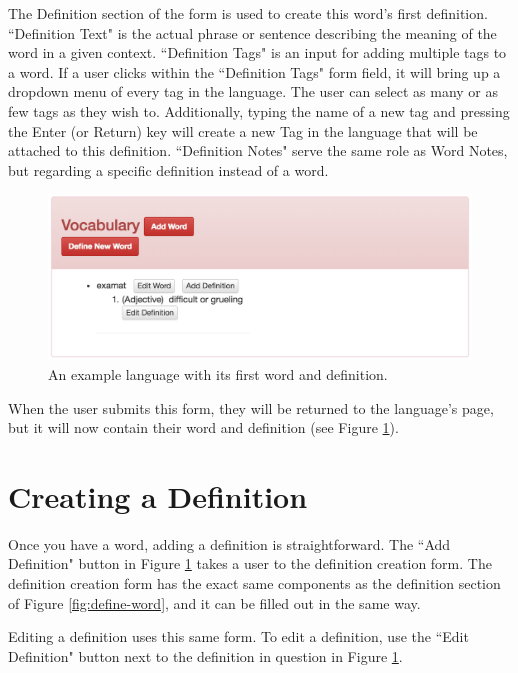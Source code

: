 The Definition section of the form is used to create this word's first definition. ``Definition Text" is the actual phrase or sentence describing the meaning of the word in a given context. ``Definition Tags" is an input for adding multiple tags to a word. If a user clicks within the ``Definition Tags" form field, it will bring up a dropdown menu of every tag in the language. The user can select as many or as few tags as they wish to. Additionally, typing the name of a new tag and pressing the Enter (or Return) key will create a new Tag in the language that will be attached to this definition. ``Definition Notes" serve the same role as Word Notes, but regarding a specific definition instead of a word.

\begin{figure}[h]
\includegraphics[width=\textwidth]{figures/example-language-one-word-logged-in}
\caption{An example language with its first word and definition.}
\centering
\label{fig:example-language-one-word-logged-in}
\end{figure}

When the user submits this form, they will be returned to the language's page, but it will now contain
their word and definition (see Figure \ref{fig:example-language-one-word-logged-in}).

\section{Creating a Definition}
\label{sec:create-definition}

Once you have a word, adding a definition is straightforward. The ``Add Definition" button in Figure \ref{fig:example-language-one-word-logged-in} takes a user to the definition creation form. The definition creation form has the exact same components as the definition section of Figure \ref{fig:define-word}, and it can be filled out in the same way.

Editing a definition uses this same form. To edit a definition, use the ``Edit Definition" button next to the definition in question in Figure \ref{fig:example-language-one-word-logged-in}.

